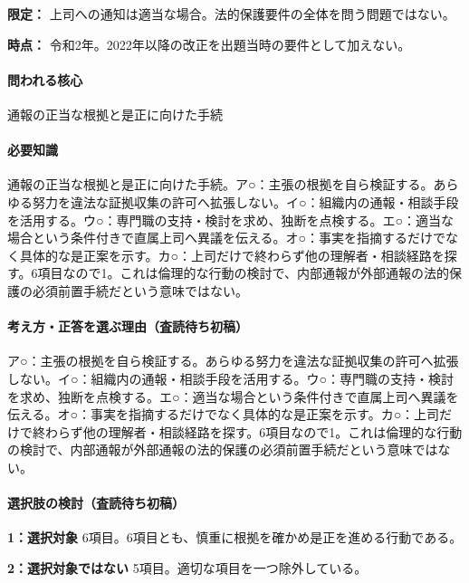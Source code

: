 \noindent\textbf{限定：} 上司への通知は適当な場合。法的保護要件の全体を問う問題ではない。\par

\noindent\textbf{時点：} 令和2年。2022年以降の改正を出題当時の要件として加えない。\par

\paragraph{問われる核心} 通報の正当な根拠と是正に向けた手続

\paragraph{必要知識} 通報の正当な根拠と是正に向けた手続。ア○：主張の根拠を自ら検証する。あらゆる努力を違法な証拠収集の許可へ拡張しない。イ○：組織内の通報・相談手段を活用する。ウ○：専門職の支持・検討を求め、独断を点検する。エ○：適当な場合という条件付きで直属上司へ異議を伝える。オ○：事実を指摘するだけでなく具体的な是正案を示す。カ○：上司だけで終わらず他の理解者・相談経路を探す。6項目なので1。これは倫理的な行動の検討で、内部通報が外部通報の法的保護の必須前置手続だという意味ではない。

\paragraph{考え方・正答を選ぶ理由（査読待ち初稿）} ア○：主張の根拠を自ら検証する。あらゆる努力を違法な証拠収集の許可へ拡張しない。イ○：組織内の通報・相談手段を活用する。ウ○：専門職の支持・検討を求め、独断を点検する。エ○：適当な場合という条件付きで直属上司へ異議を伝える。オ○：事実を指摘するだけでなく具体的な是正案を示す。カ○：上司だけで終わらず他の理解者・相談経路を探す。6項目なので1。これは倫理的な行動の検討で、内部通報が外部通報の法的保護の必須前置手続だという意味ではない。

\paragraph{選択肢の検討（査読待ち初稿）}\mbox{}\par

\noindent\textbf{1：選択対象} 6項目。6項目とも、慎重に根拠を確かめ是正を進める行動である。\par

\noindent\textbf{2：選択対象ではない} 5項目。適切な項目を一つ除外している。\par

